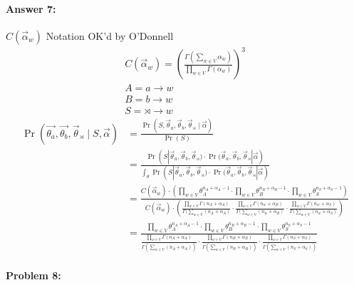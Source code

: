 \documentclass[12pt, letterpaper]{article}
\begin{document}
\paragraph{Answer 7:}$C(\vec{\alpha}_{w})$ Notation OK'd by O'Donnell
\begin{gather*}
    C(\vec{\alpha}_{w}) = \left(\frac{\Gamma(\sum_{w \in V} \alpha_{w})}{\prod_{w \in V} \Gamma(\alpha_{w})}\right)^3\\
    A = a\rightarrow w\\
    B = b \rightarrow w\\
    S = \rtimes \rightarrow w
\end{gather*}
\begin{align*}
    \Pr(\vec{\theta_a}, \vec{\theta_b}, \vec{\theta}_{\rtimes} \mid S, \vec{\alpha})&= \frac{\Pr(S, \vec{\theta}_{a}, \vec{\theta}_{b}, \vec{\theta}_{\rtimes} \mid \vec{\alpha})}{\Pr(S)}\\
    &= \frac{\Pr(S | \vec{\theta}_{a}, \vec{\theta}_{b}, \vec{\theta}_{\rtimes})\cdot{\Pr(\vec{\theta}_{a}}, \vec{\theta}_{b}, \vec{\theta}_{\rtimes}|\vec{\alpha})}{\int_{\theta} \Pr(S | \vec{\theta}_{a}, \vec{\theta}_{b}, \vec{\theta}_{\rtimes})\cdot{\Pr(\vec{\theta}_{a}}, \vec{\theta}_{b}, \vec{\theta}_{\rtimes}|\vec{\alpha})}\\
    &=\frac{C(\vec{\alpha}_{w})\cdot{\left(
    \prod_{w \in V} \theta_{A}^{n_A+\alpha_{A}-1}\cdot{
    \prod_{w \in V} \theta_{B}^{n_B+\alpha_{B}-1}\cdot{
    \prod_{w \in V} \theta_{S}^{n_S+\alpha_{S}-1}}}\right)}}{C(\vec{\alpha}_{w})\cdot{\left(
    \frac{\prod_{w \in V} \Gamma(n_A+\alpha_{A})}{\Gamma(\sum_{w \in V} (n_A+\alpha_{A})}\cdot{
    \frac{\prod_{w \in V} \Gamma(n_w+\alpha_{B})}{\Gamma(\sum_{w \in V} (n_w+\alpha_{B})}\cdot{
    \frac{\prod_{w \in V} \Gamma(n_w+\alpha_{S})}{\Gamma(\sum_{w \in V} (n_w+\alpha_{S})}}}\right)}}\\
    &=\frac{
    \prod_{w \in V} \theta_{A}^{n_A+\alpha_{A}-1}\cdot{
    \prod_{w \in V} \theta_{B}^{n_B+\alpha_{B}-1}\cdot{
    \prod_{w \in V} \theta_{S}^{n_S+\alpha_{S}-1}}}}{
    \frac{\prod_{w \in V} \Gamma(n_A+\alpha_{A})}{\Gamma(\sum_{w \in V} (n_A+\alpha_{A}))}\cdot{
    \frac{\prod_{w \in V} \Gamma(n_B+\alpha_{B})}{\Gamma(\sum_{w \in V} (n_B+\alpha_{B}))}\cdot{
    \frac{\prod_{w \in V} \Gamma(n_S+\alpha_{S})}{\Gamma(\sum_{w \in V} (n_S+\alpha_{S}))}}}}
\end{align*}

\hrulefill
\paragraph{Problem 8:}
\end{document}
